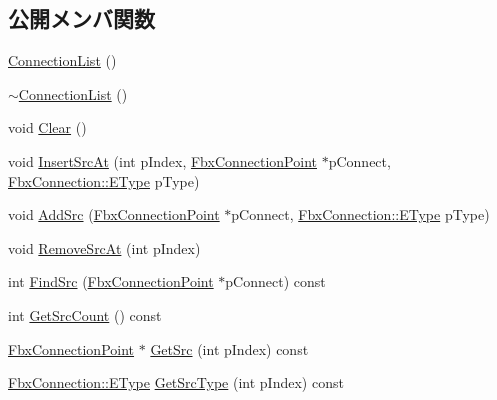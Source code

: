 \subsection*{公開メンバ関数}
\begin{DoxyCompactItemize}
\item 
\hyperlink{class_fbx_connection_point_1_1_connection_list_ab8cde9ae3b86ab4de4128e4b6df82fb9}{Connection\+List} ()
\item 
\hyperlink{class_fbx_connection_point_1_1_connection_list_a85e0883ae127df8d8cef07cbdcc553f1}{$\sim$\+Connection\+List} ()
\item 
void \hyperlink{class_fbx_connection_point_1_1_connection_list_a3342409b306106433c9146575ae6f101}{Clear} ()
\item 
void \hyperlink{class_fbx_connection_point_1_1_connection_list_ade7601c42dc24b4bb9300b58257ca0e0}{Insert\+Src\+At} (int p\+Index, \hyperlink{class_fbx_connection_point}{Fbx\+Connection\+Point} $\ast$p\+Connect, \hyperlink{class_fbx_connection_a3df448a5db356652ab99fd2be2553749}{Fbx\+Connection\+::\+E\+Type} p\+Type)
\item 
void \hyperlink{class_fbx_connection_point_1_1_connection_list_a140699ae7b2ea49f2bac26557f2ac840}{Add\+Src} (\hyperlink{class_fbx_connection_point}{Fbx\+Connection\+Point} $\ast$p\+Connect, \hyperlink{class_fbx_connection_a3df448a5db356652ab99fd2be2553749}{Fbx\+Connection\+::\+E\+Type} p\+Type)
\item 
void \hyperlink{class_fbx_connection_point_1_1_connection_list_a89e36a5a48f4d74969eb3fbd167b14a6}{Remove\+Src\+At} (int p\+Index)
\item 
int \hyperlink{class_fbx_connection_point_1_1_connection_list_acfe276071b4c57dcf9041955068e3c7a}{Find\+Src} (\hyperlink{class_fbx_connection_point}{Fbx\+Connection\+Point} $\ast$p\+Connect) const
\item 
int \hyperlink{class_fbx_connection_point_1_1_connection_list_a51856ff4efd8753b1e8c72f3fd1bc218}{Get\+Src\+Count} () const
\item 
\hyperlink{class_fbx_connection_point}{Fbx\+Connection\+Point} $\ast$ \hyperlink{class_fbx_connection_point_1_1_connection_list_ae1389883e6c2ed116dde9de708ba07f7}{Get\+Src} (int p\+Index) const
\item 
\hyperlink{class_fbx_connection_a3df448a5db356652ab99fd2be2553749}{Fbx\+Connection\+::\+E\+Type} \hyperlink{class_fbx_connection_point_1_1_connection_list_a42cda40f66b254c7e314355c1389b9d6}{Get\+Src\+Type} (int p\+Index) const
\item 

\end{DoxyCompactItemize}
